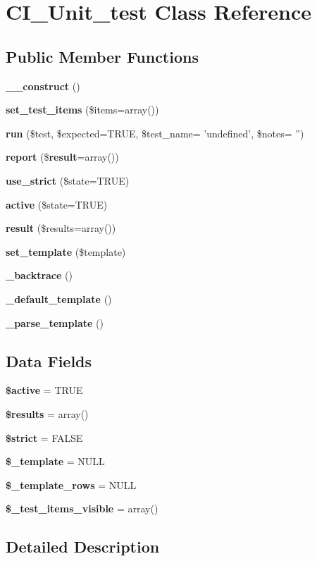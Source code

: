 \section{C\-I\-\_\-\-Unit\-\_\-test Class Reference}
\label{class_c_i___unit__test}
\subsection*{Public Member Functions}
\begin{DoxyCompactItemize}
\item 
{\bf \-\_\-\-\_\-construct} ()
\item 
{\bf set\-\_\-test\-\_\-items} (\$items=array())
\item 
{\bf run} (\$test, \$expected=T\-R\-U\-E, \$test\-\_\-name= 'undefined', \$notes= '')
\item 
{\bf report} (\${\bf result}=array())
\item 
{\bf use\-\_\-strict} (\$state=T\-R\-U\-E)
\item 
{\bf active} (\$state=T\-R\-U\-E)
\item 
{\bf result} (\$results=array())
\item 
{\bf set\-\_\-template} (\$template)
\item 
{\bf \-\_\-backtrace} ()
\item 
{\bf \-\_\-default\-\_\-template} ()
\item 
{\bf \-\_\-parse\-\_\-template} ()
\end{DoxyCompactItemize}
\subsection*{Data Fields}
\begin{DoxyCompactItemize}
\item 
{\bf \$active} = T\-R\-U\-E
\item 
{\bf \$results} = array()
\item 
{\bf \$strict} = F\-A\-L\-S\-E
\item 
{\bf \$\-\_\-template} = N\-U\-L\-L
\item 
{\bf \$\-\_\-template\-\_\-rows} = N\-U\-L\-L
\item 
{\bf \$\-\_\-test\-\_\-items\-\_\-visible} = array()
\end{DoxyCompactItemize}


\subsection{Detailed Description}


